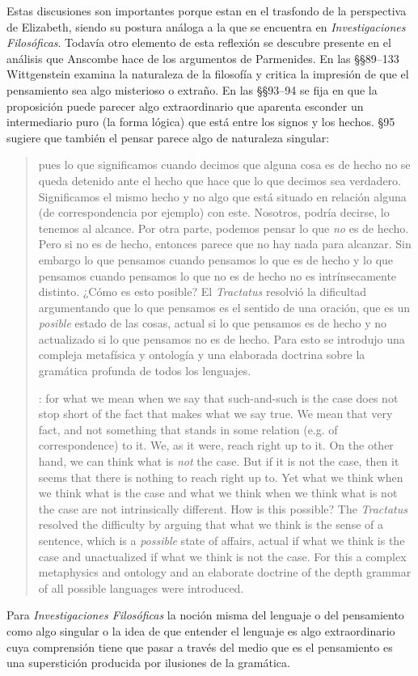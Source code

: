  Estas discusiones son importantes porque estan en el trasfondo de la perspectiva de Elizabeth, siendo su postura análoga a la que se encuentra en \emph{Investigaciones Filosóficas}. Todavía otro elemento de esta reflexión se descubre presente en el análisis que Anscombe hace de los argumentos de Parmenides. En las \S\S89--133 Wittgenstein examina la naturaleza de la filosofía y critica la impresión de que el pensamiento sea algo misterioso o extraño. En las \S\S93--94 se fija en que la proposición puede parecer algo extraordinario que aparenta esconder un intermediario puro (la forma lógica) que está entre los signos y los hechos. \S95 sugiere que también el pensar parece algo de naturaleza singular: \blockquote[{\cite[4]{hacker2000mind}}: for what we mean when we say that such-and-such is the case does not stop short of the fact that makes what we say true. We mean that very fact, and not something that stands in some relation (e.g. of correspondence) to it. We, as it were, reach right up to it. On the other hand, we can think what is \emph{not} the case. But if it is not the case, then it seems that there is nothing to reach right up to. Yet what we think when we think what is the case and what we think when we think what is not the case are not intrinsically different. How is this possible? The \emph{Tractatus} resolved the difficulty by arguing that what we think is the sense of a sentence, which is a \emph{possible} state of affairs, actual if what we think is the case and unactualized if what we think is not the case. For this a complex metaphysics and ontology and an elaborate doctrine of the depth grammar of all possible languages were introduced.]{pues lo que significamos cuando decimos que alguna cosa es de hecho no se queda detenido ante el hecho que hace que lo que decimos sea verdadero. Significamos el mismo hecho y no algo que está situado en relación alguna (de correspondencia por ejemplo) con este. Nosotros, podría decirse, lo tenemos al alcance. Por otra parte, podemos pensar lo que \emph{no} es de hecho. Pero si no es de hecho, entonces parece que no hay nada para alcanzar. Sin embargo lo que pensamos cuando pensamos lo que es de hecho y lo que pensamos cuando pensamos lo que no es de hecho no es intrínsecamente distinto. ¿Cómo es esto posible? El \emph{Tractatus} resolvió la dificultad argumentando que lo que pensamos es el sentido de una oración, que es un \emph{posible} estado de las cosas, actual si lo que pensamos es de hecho y no actualizado si lo que pensamos no es de hecho. Para esto se introdujo una compleja metafísica y ontología y una elaborada doctrina sobre la gramática profunda de todos los lenguajes.} Para \emph{Investigaciones Filosóficas} la noción misma del lenguaje o del pensamiento como algo singular o la idea de que entender el lenguaje es algo extraordinario cuya comprensión tiene que pasar a través del medio que es el pensamiento es una superstición producida por ilusiones de la gramática.

